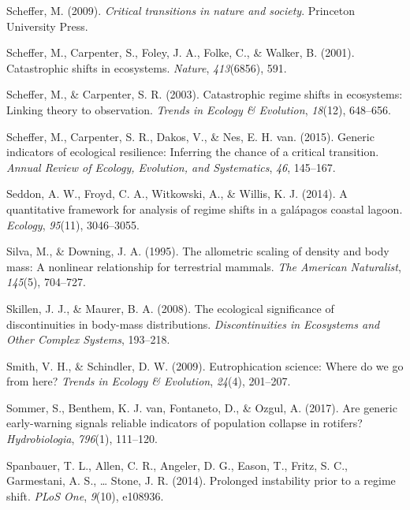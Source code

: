 \documentclass[12pt,twoside,openany]{reedthesis}
\begin{document}
\leavevmode\hypertarget{ref-scheffer_critical_2009}{}%
Scheffer, M. (2009). \emph{Critical transitions in nature and society}. Princeton University Press.

\leavevmode\hypertarget{ref-scheffer_catastrophic_2001}{}%
Scheffer, M., Carpenter, S., Foley, J. A., Folke, C., \& Walker, B. (2001). Catastrophic shifts in ecosystems. \emph{Nature}, \emph{413}(6856), 591.

\leavevmode\hypertarget{ref-scheffer2003catastrophic}{}%
Scheffer, M., \& Carpenter, S. R. (2003). Catastrophic regime shifts in ecosystems: Linking theory to observation. \emph{Trends in Ecology \& Evolution}, \emph{18}(12), 648--656.

\leavevmode\hypertarget{ref-scheffer2015generic}{}%
Scheffer, M., Carpenter, S. R., Dakos, V., \& Nes, E. H. van. (2015). Generic indicators of ecological resilience: Inferring the chance of a critical transition. \emph{Annual Review of Ecology, Evolution, and Systematics}, \emph{46}, 145--167.

\leavevmode\hypertarget{ref-seddon2014quantitative}{}%
Seddon, A. W., Froyd, C. A., Witkowski, A., \& Willis, K. J. (2014). A quantitative framework for analysis of regime shifts in a galápagos coastal lagoon. \emph{Ecology}, \emph{95}(11), 3046--3055.

\leavevmode\hypertarget{ref-silva1995allometric}{}%
Silva, M., \& Downing, J. A. (1995). The allometric scaling of density and body mass: A nonlinear relationship for terrestrial mammals. \emph{The American Naturalist}, \emph{145}(5), 704--727.

\leavevmode\hypertarget{ref-skillen2008ecological}{}%
Skillen, J. J., \& Maurer, B. A. (2008). The ecological significance of discontinuities in body-mass distributions. \emph{Discontinuities in Ecosystems and Other Complex Systems}, 193--218.

\leavevmode\hypertarget{ref-smith2009eutrophication}{}%
Smith, V. H., \& Schindler, D. W. (2009). Eutrophication science: Where do we go from here? \emph{Trends in Ecology \& Evolution}, \emph{24}(4), 201--207.

\leavevmode\hypertarget{ref-sommer2017generic}{}%
Sommer, S., Benthem, K. J. van, Fontaneto, D., \& Ozgul, A. (2017). Are generic early-warning signals reliable indicators of population collapse in rotifers? \emph{Hydrobiologia}, \emph{796}(1), 111--120.

\leavevmode\hypertarget{ref-spanbauer_prolonged_2014}{}%
Spanbauer, T. L., Allen, C. R., Angeler, D. G., Eason, T., Fritz, S. C., Garmestani, A. S., \ldots{} Stone, J. R. (2014). Prolonged instability prior to a regime shift. \emph{PLoS One}, \emph{9}(10), e108936.
\end{document}

